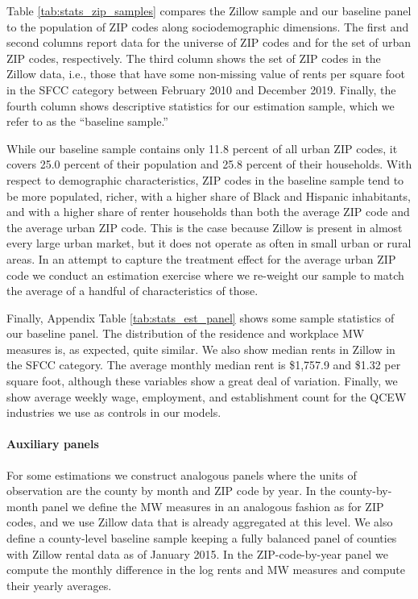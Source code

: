 Table \ref{tab:stats_zip_samples} compares the Zillow sample and our baseline 
panel to the population of ZIP codes along sociodemographic dimensions. 
The first and second columns report data for the universe of ZIP codes and 
for the set of urban ZIP codes, respectively.
The third column shows the set of ZIP codes in the Zillow data, i.e., those 
that have some non-missing value of rents per square foot in the SFCC category 
between February 2010 and December 2019.
Finally, the fourth column shows descriptive statistics for our estimation 
sample, which we refer to as the ``baseline sample.''

While our baseline sample contains only 11.8 percent of all urban ZIP codes, it 
covers 25.0 percent of their population and 25.8 percent of their households.
With respect to demographic characteristics, ZIP codes in the baseline sample 
tend to be more populated, richer, with a higher share of Black and Hispanic 
inhabitants, and with a higher share of renter households than both 
the average ZIP code and the average urban ZIP code.
This is the case because Zillow is present in almost every large urban market, 
but it does not operate as often in small urban or rural areas.
In an attempt to capture the treatment effect for the average urban ZIP code 
we conduct an estimation exercise where we re-weight our sample to match the 
average of a handful of characteristics of those.

Finally, Appendix Table \ref{tab:stats_est_panel} shows some sample statistics 
of our baseline panel.
The distribution of the residence and workplace MW measures is, as expected,
quite similar.
We also show median rents in Zillow in the SFCC category.
The average monthly median rent is \$1,757.9 and \$1.32 per square foot, 
although these variables show a great deal of variation.
Finally, we show average weekly wage, employment, and establishment count 
for the QCEW industries we use as controls in our models.

\paragraph{Auxiliary panels}

For some estimations we construct analogous panels where the units of 
observation are the county by month and ZIP code by year.
In the county-by-month panel we define the MW measures in an analogous fashion 
as for ZIP codes, and we use Zillow data that is already aggregated at this 
level.
We also define a county-level baseline sample keeping a fully balanced panel of 
counties with Zillow rental data as of January 2015.
In the ZIP-code-by-year panel we compute the monthly difference in the log rents 
and MW measures and compute their yearly averages.
